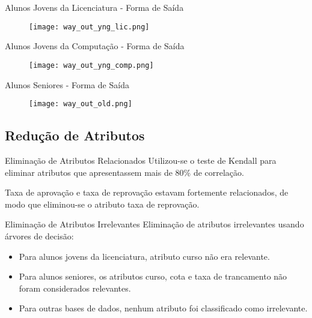 \begin{frame}{Alunos Jovens da Licenciatura - Forma de Saída}
    \begin{figure}[!ht]
        \centering
        \texttt{[image: way\_out\_yng\_lic.png]}
    \end{figure}
\end{frame}

\begin{frame}{Alunos Jovens da Computação - Forma de Saída}
    \begin{figure}[!ht]
        \centering
        \texttt{[image: way\_out\_yng\_comp.png]}
    \end{figure}
\end{frame}

\begin{frame}{Alunos Seniores - Forma de Saída}
    \begin{figure}[!ht]
        \centering
        \texttt{[image: way\_out\_old.png]}
    \end{figure}
\end{frame}

\subsection{Redução de Atributos}
\begin{frame}{Eliminação de Atributos Relacionados}
    Utilizou-se o teste de Kendall para eliminar atributos que apresentassem mais de
    80\% de correlação. 

    \vspace{0.5cm}

    Taxa de aprovação e taxa de reprovação estavam fortemente relacionados, de modo
    que eliminou-se o atributo taxa de reprovação. 
\end{frame}

\begin{frame}{Eliminação de Atributos Irrelevantes}
    Eliminação de atributos irrelevantes usando árvores de decisão: 
    \begin{itemize}
        \item Para alunos jovens da licenciatura, atributo curso não era relevante. 
        \item Para alunos seniores, os atributos curso, cota e taxa de trancamento
            não foram considerados relevantes. 
        \item Para outras bases de dados, nenhum atributo foi classificado como
            irrelevante. 
    \end{itemize}
\end{frame}

